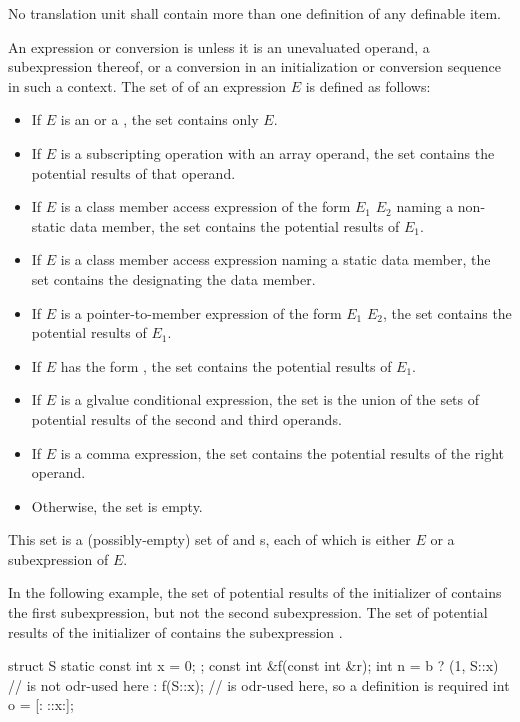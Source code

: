 \pnum
No translation unit shall contain more than one definition of any
definable item.

\pnum
{}%
An expression or conversion is  unless it is
an unevaluated operand,
a subexpression thereof, or
a conversion in an initialization or conversion sequence in such a context.
The set of  of an expression $E$ is
defined as follows:
\begin{itemize}
\item If $E$ is
an  or
a , the set
contains only $E$.
\item If $E$ is a subscripting operation with
an array operand, the set contains the potential results of that operand.
\item If $E$ is a class member access
expression of the form
$E_1$   $E_2$
naming a non-static data member,
the set contains the potential results of $E_1$.
\item If $E$ is a class member access expression
naming a static data member,
the set contains the  designating the data member.
\item If $E$ is a pointer-to-member
expression of the form
$E_1$  $E_2$,
the set contains the potential results of $E_1$.
\item If $E$ has the form , the set contains the
potential results of $E_1$.
\item If $E$ is a glvalue conditional
expression, the set is the union of the sets of
potential results of the second and third operands.
\item If $E$ is a comma expression, the set
contains the potential results of the right operand.
\item Otherwise, the set is empty.
\end{itemize}
\begin{note}
This set is a (possibly-empty) set of
 and s,
each of which is either $E$ or a subexpression of $E$.
\begin{example}
In the following example, the set of potential results of the initializer
of  contains the first  subexpression, but not the second
 subexpression.
The set of potential results of the initializer of  contains
the subexpression .
\begin{codeblock}
struct S { static const int x = 0; };
const int &f(const int &r);
int n = b ? (1, S::x)           //  is not odr-used here
          : f(S::x);            //  is odr-used here, so a definition is required
int o = [:^^S::x:];
\end{codeblock}
\end{example}
\end{note}

